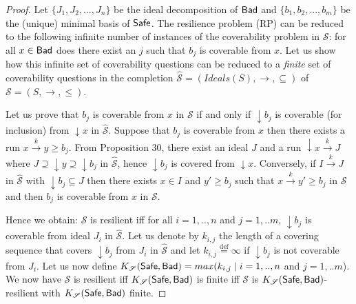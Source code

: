\begin{proof}
Let $\{J_1, J_2,...,J_n\}$ be the ideal decomposition of $\textsf{Bad}$ and $\{b_1,b_2,...,b_m\}$ be the (unique) minimal basis of $\textsf{Safe}$.
The %
resilience problem (RP) can be reduced to the following infinite number of instances of the coverability problem in $\mathscr{S}$: for all $x \in \textsf{Bad}$ does there exist an $j$ such that $b_j$ is coverable from $x$. Let us show how this infinite set of coverability questions can be reduced to a \emph{finite} set of coverability questions in the completion $\hat{\mathscr{S}}=(Ideals(S),\rightarrow, \subseteq)$ of $\mathscr{S}=(S,\rightarrow, \leq)$. 


Let us prove that $b_j$ is coverable from $x$ in $\mathscr{S}$ if and only if $\downarrow b_j$ is coverable (for inclusion) from $\downarrow x$ in $\hat{\mathscr{S}}$.
%
Suppose that $b_j$ is coverable from $x$ then there exists a run $x \xrightarrow{k} y \geq b_j$. From Proposition 30, there exist an ideal $J$ and a run $\downarrow x \xrightarrow{k} J$ where $J \supseteq \downarrow y \supseteq \downarrow b_j$ in $\hat{\mathscr{S}}$, hence $\downarrow b_j$ is covered from $\downarrow x$.
Conversely, if $I \xrightarrow{k} J$ in $\hat{\mathscr{S}}$ with $\downarrow b_j \subseteq J$ then 
there exists $x \in I$ and $y' \geq b_j$ such that $x \xrightarrow{k} y'  \geq b_j$ in $\mathscr{S}$ and then $b_j$ is coverable from $x$ in $\mathscr{S}$.

Hence we obtain: $\mathscr{S}$ is resilient iff for all $i=1,..,n$ and $j= 1,..m$, $\downarrow b_j$ is coverable from ideal $J_i$ in $\hat{\mathscr{S}}$.
%
Let us denote by $k_{i,j}$ the length of a covering sequence that covers $\downarrow b_j$ from $J_i$ in $\hat{\mathscr{S}}$ and let $k_{i,j}\stackrel{\text{def}}{=}\infty$ if $\downarrow b_j$ is not coverable from $J_i$. Let us now define $K_{\mathscr{S}}(\textsf{Safe},\textsf{Bad})=max(k_{i,j} \mid i=1,..,n$ and $j= 1,..m$).
We now have $\mathscr{S}$ is resilient iff $K_{\mathscr{S}}(\textsf{Safe},\textsf{Bad})$ is finite iff $\mathscr{S}$ is $K_{\mathscr{S}}(\textsf{Safe},\textsf{Bad})$-resilient with $K_{\mathscr{S}}(\textsf{Safe},\textsf{Bad})$ finite.


\end{proof}
